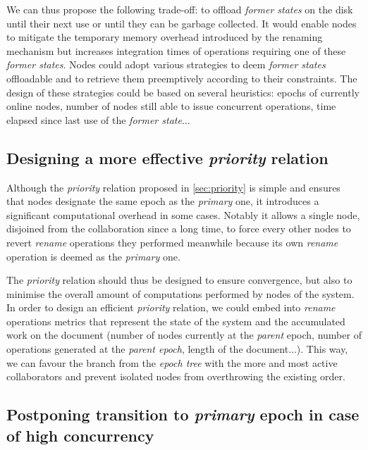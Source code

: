 \documentclass[10pt,journal,compsoc]{IEEEtran}
\begin{document}
We can thus propose the following trade-off: to offload \emph{former states} on the disk until their next use or until they can be garbage collected.
It would enable nodes to mitigate the temporary memory overhead introduced by the renaming mechanism but increases integration times of operations requiring one of these \emph{former states}.
Nodes could adopt various strategies to deem \emph{former states} offloadable and to retrieve them preemptively according to their constraints.
The design of these strategies could be based on several heuristics: epochs of currently online nodes, number of nodes still able to issue concurrent operations, time elapsed since last use of the \emph{former state}...

\subsection{Designing a more effective \emph{priority} relation}
\label{sec:designing-more-effective-priority-relation}

Although the \emph{priority} relation proposed in \autoref{sec:priority} is simple and ensures that nodes designate the same epoch as the \emph{primary} one, it introduces a significant computational overhead in some cases.
Notably it allows a single node, disjoined from the collaboration since a long time, to force every other nodes to revert \emph{rename} operations they performed meanwhile because its own \emph{rename} operation is deemed as the \emph{primary} one.

The \emph{priority} relation should thus be designed to ensure convergence, but also to minimise the overall amount of computations performed by nodes of the system.
In order to design an efficient \emph{priority} relation, we could embed into \emph{rename} operations metrics that represent the state of the system and the accumulated work on the document (number of nodes currently at the \emph{parent} epoch, number of operations generated at the \emph{parent epoch}, length of the document...).
This way, we can favour the branch from the \emph{epoch tree} with the more and most active collaborators and prevent isolated nodes from overthrowing the existing order.

\subsection{Postponing transition to \emph{primary} epoch in case of high concurrency}
\label{sec:postponing-transition-to-new-epoch}
\end{document}
